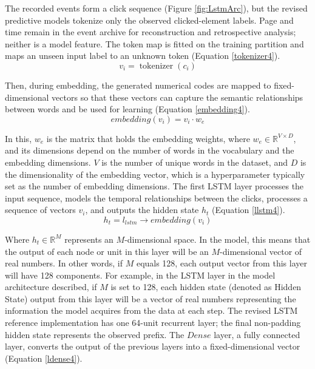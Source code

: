 \documentclass[sn-mathphys-num, Numbered]{sn-jnl}%
\theoremstyle{thmstyleone}%
\theoremstyle{thmstyletwo}%
\theoremstyle{thmstylethree}%
\begin{document}
The recorded events form a click sequence (Figure \ref{fig:LstmArc}), but the revised predictive models tokenize only the observed clicked-element labels. Page and time remain in the event archive for reconstruction and retrospective analysis; neither is a model feature. The token map is fitted on the training partition and maps an unseen input label to an unknown token (Equation \ref{tokenizer4}).
\begin{equation}\label{tokenizer4}
	v_i = \operatorname{tokenizer}(c_i)
\end{equation}

Then, during embedding, the generated numerical codes are mapped to fixed-dimensional vectors so that these vectors can capture the semantic relationships between words and be used for learning (Equation \ref{embedding4}).
\begin{equation}\label{embedding4}
	embedding(v_i)= v_i \cdot w_e
\end{equation}

In this, $w_e$ is the matrix that holds the embedding weights, where $w_e \in \mathbb{R}^{V \times D}$, and its dimensions depend on the number of words in the vocabulary and the embedding dimensions. $V$ is the number of unique words in the dataset, and $D$ is the dimensionality of the embedding vector, which is a hyperparameter typically set as the number of embedding dimensions.
The first LSTM layer processes the input sequence, models the temporal relationships between the clicks, processes a sequence of vectors $v_i$, and outputs the hidden state $h_t$ (Equation \ref{llstm4}).
\begin{equation}\label{llstm4}
	h_t = l_{lstm} \rightarrow embedding(v_i)
\end{equation}

Where $h_t \in \mathbb{R}^M$ represents an $M$-dimensional space. In the model, this means that the output of each node or unit in this layer will be an $M$-dimensional vector of real numbers. In other words, if $M$ equals 128, each output vector from this layer will have 128 components. For example, in the LSTM layer in the model architecture described, if $M$ is set to 128, each hidden state (denoted as Hidden State) output from this layer will be a vector of real numbers representing the information the model acquires from the data at each step.
The revised LSTM reference implementation has one 64-unit recurrent layer; the final non-padding hidden state represents the observed prefix.
The $Dense$ layer, a fully connected layer, converts the output of the previous layers into a fixed-dimensional vector (Equation \ref{ldense4}).
\end{document}

